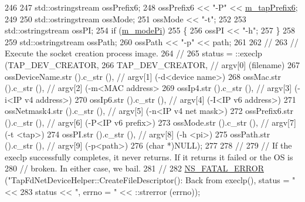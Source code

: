 \begin{DoxyCode}
246 
247       std::ostringstream ossPrefix6;
248       ossPrefix6 << \textcolor{stringliteral}{"-P"} << \hyperlink{classns3_1_1TapFdNetDeviceHelper_a9d2b4e1c9fcff1a2b254681f0e8f3719}{m\_tapPrefix6};
249 
250       std::ostringstream ossMode;
251       ossMode << \textcolor{stringliteral}{"-t"};
252 
253       std::ostringstream ossPI;
254       \textcolor{keywordflow}{if} (\hyperlink{classns3_1_1TapFdNetDeviceHelper_a4d9d824e6c5ac46ac9ebc34740cedd2b}{m\_modePi})
255         \{
256           ossPI << \textcolor{stringliteral}{"-h"};
257         \}
258 
259       std::ostringstream ossPath;
260       ossPath << \textcolor{stringliteral}{"-p"} << path;
261 
262       \textcolor{comment}{//}
263       \textcolor{comment}{// Execute the socket creation process image.}
264       \textcolor{comment}{//}
265       status = ::execlp (TAP\_DEV\_CREATOR,
266                          TAP\_DEV\_CREATOR,                       \textcolor{comment}{// argv[0] (filename)}
267                          ossDeviceName.str ().c\_str (),     \textcolor{comment}{// argv[1] (-d<device name>)}
268                          ossMac.str ().c\_str (),            \textcolor{comment}{// argv[2] (-m<MAC address>}
269                          ossIp4.str ().c\_str (),            \textcolor{comment}{// argv[3] (-i<IP v4 address>)}
270                          ossIp6.str ().c\_str (),            \textcolor{comment}{// argv[4] (-I<IP v6 address>)}
271                          ossNetmask4.str ().c\_str (),       \textcolor{comment}{// argv[5] (-n<IP v4 net mask>)}
272                          ossPrefix6.str ().c\_str (),        \textcolor{comment}{// argv[6] (-P<IP v6 prefix>)}
273                          ossMode.str ().c\_str (),           \textcolor{comment}{// argv[7] (-t <tap>)}
274                          ossPI.str ().c\_str (),             \textcolor{comment}{// argv[8] (-h <pi>)}
275                          ossPath.str ().c\_str (),           \textcolor{comment}{// argv[9] (-p<path>)}
276                          (\textcolor{keywordtype}{char} *)NULL);
277 
278       \textcolor{comment}{//}
279       \textcolor{comment}{// If the execlp successfully completes, it never returns.  If it returns it failed or the OS is}
280       \textcolor{comment}{// broken.  In either case, we bail.}
281       \textcolor{comment}{//}
282       \hyperlink{group__fatal_ga5131d5e3f75d7d4cbfd706ac456fdc85}{NS\_FATAL\_ERROR} (\textcolor{stringliteral}{"TapFdNetDeviceHelper::CreateFileDescriptor(): Back from execlp(),
       status = "} <<
283                       status << \textcolor{stringliteral}{", errno = "} << ::strerror (errno));

\end{DoxyCode}
